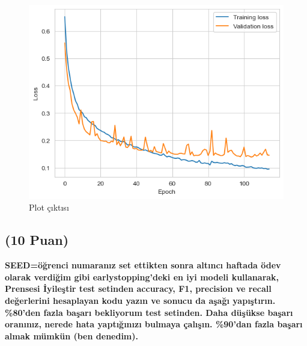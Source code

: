 \documentclass[11pt]{article}
\begin{document}

\begin{figure}[ht!]
    \centering
    \includegraphics{plotoutput.png}
    \caption{Plot çıktısı}
    \label{fig:my_pic}
\end{figure}


\subsection{(10 Puan)} \textbf{SEED=öğrenci numaranız set ettikten sonra altıncı haftada ödev olarak verdiğim gibi earlystopping'deki en iyi modeli kullanarak, Prensesi İyileştir test setinden accuracy, F1, precision ve recall değerlerini hesaplayan kodu yazın ve sonucu da aşağı yapıştırın. \%80'den fazla başarı bekliyorum test setinden. Daha düşükse başarı oranınız, nerede hata yaptığınızı bulmaya çalışın. \%90'dan fazla başarı almak mümkün (ben denedim).}
\end{document}
